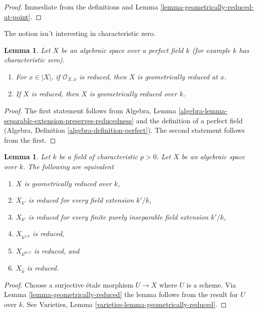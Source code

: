 \documentclass{stacks-project}
\theoremstyle{plain}
\newtheorem{lemma}[subsection]{Lemma}
\theoremstyle{definition}
\theoremstyle{remark}
\numberwithin{equation}{subsection}
\begin{document}
\begin{proof}
Immediate from the definitions and
Lemma \ref{lemma-geometrically-reduced-at-point}.
\end{proof}

\noindent
The notion isn't interesting in characteristic zero.

\begin{lemma}
\label{lemma-perfect-reduced}
Let $X$ be an algebraic space over a perfect field $k$ (for example
$k$ has characteristic zero).
\begin{enumerate}
\item For $x \in |X|$, if $\mathcal{O}_{X, \overline{x}}$ is
reduced, then $X$ is geometrically reduced at $x$.
\item If $X$ is reduced, then $X$ is geometrically reduced over $k$.
\end{enumerate}
\end{lemma}

\begin{proof}
The first statement follows from
Algebra, Lemma \ref{algebra-lemma-separable-extension-preserves-reducedness}
and the definition of a perfect field
(Algebra, Definition \ref{algebra-definition-perfect}).
The second statement follows from the first.
\end{proof}

\begin{lemma}
\label{lemma-geometrically-reduced-positive-characteristic}
Let $k$ be a field of characteristic $p > 0$. Let $X$ be an algebraic space
over $k$. The following are equivalent
\begin{enumerate}
\item $X$ is geometrically reduced over $k$,
\item $X_{k'}$ is reduced for every field extension $k'/k$,
\item $X_{k'}$ is reduced for every
finite purely inseparable field extension $k'/k$,
\item $X_{k^{1/p}}$ is reduced,
\item $X_{k^{perf}}$ is reduced, and
\item $X_{\bar k}$ is reduced.
\end{enumerate}
\end{lemma}

\begin{proof}
Choose a surjective \'etale morphism $U \to X$ where $U$ is a scheme.
Via Lemma \ref{lemma-geometrically-reduced} the lemma follows from
the result for $U$ over $k$.
See Varieties, Lemma \ref{varieties-lemma-geometrically-reduced}.
\end{proof}
\end{document}
